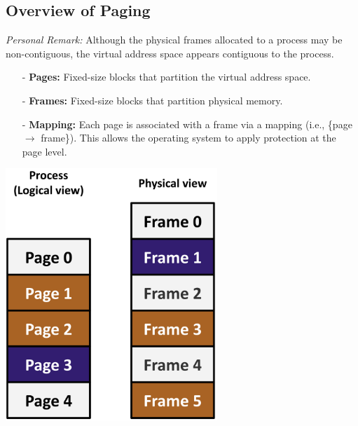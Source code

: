 \documentclass[../../compsys.tex]{subfiles}
\begin{document}
\subsection{Overview of Paging}
\textit{Personal Remark:} Although the physical frames allocated to a process may be non-contiguous, the virtual address space appears contiguous to the process.\\
\noindent
\begin{minipage}{0.45\textwidth}
  \begin{itemize}
    \item[-] \textbf{Pages:} Fixed-size blocks that partition the virtual address space.
  \item[-] \textbf{Frames:} Fixed-size blocks that partition physical memory.
  \item[-] \textbf{Mapping:} Each page is associated with a frame via a mapping (i.e., \{page $\rightarrow$ frame\}). This allows the operating system to apply protection at the page level.
\end{itemize}
\end{minipage}
\hfill
\vline
\hfill
\begin{minipage}{0.45\textwidth}
\begin{center}
  \includegraphics[width=0.6\textwidth]{chapters/L5/images/page-mmu.png}
\end{center}
\end{minipage}\\
\newpage
\end{document}
